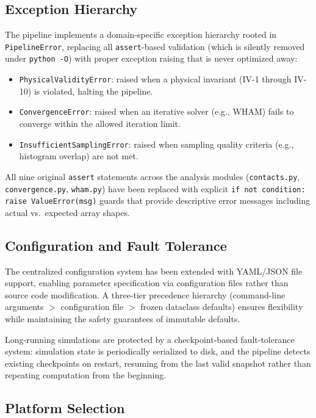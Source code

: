\documentclass[conference]{IEEEtran}
\begin{document}
\subsection{Exception Hierarchy}\label{sec:exceptions}

The pipeline implements a domain-specific exception hierarchy rooted in
\texttt{PipelineError}, replacing all \texttt{assert}-based validation
(which is silently removed under \texttt{python~-O}) with proper
exception raising that is never optimized away:
\begin{itemize}
  \item \texttt{PhysicalValidityError}: raised when a physical invariant
    (IV-1 through IV-10) is violated, halting the pipeline.
  \item \texttt{ConvergenceError}: raised when an iterative solver (e.g.,
    WHAM) fails to converge within the allowed iteration limit.
  \item \texttt{InsufficientSamplingError}: raised when sampling quality
    criteria (e.g., histogram overlap) are not met.
\end{itemize}
All nine original \texttt{assert} statements across the analysis modules
(\texttt{contacts.py}, \texttt{convergence.py}, \texttt{wham.py}) have been
replaced with explicit \texttt{if not condition: raise ValueError(msg)}
guards that provide descriptive error messages including actual vs.\
expected array shapes.

\subsection{Configuration and Fault Tolerance}\label{sec:config_v2}

The centralized configuration system has been extended with YAML/JSON
file support, enabling parameter specification via configuration files
rather than source code modification.  A three-tier precedence hierarchy
(command-line arguments $>$ configuration file $>$ frozen dataclass
defaults) ensures flexibility while maintaining the safety guarantees
of immutable defaults.

Long-running simulations are protected by a checkpoint-based
fault-tolerance system: simulation state is periodically serialized to
disk, and the pipeline detects existing checkpoints on restart, resuming
from the last valid snapshot rather than repeating computation from the
beginning.

\subsection{Platform Selection}\label{sec:platform}
\end{document}
